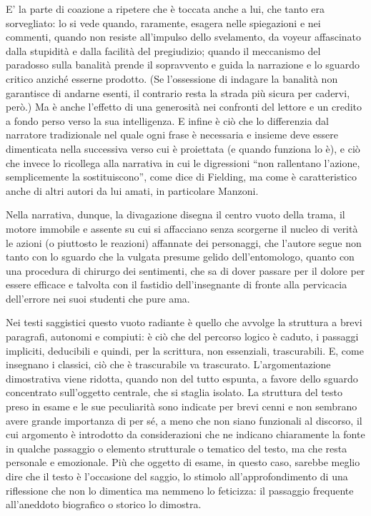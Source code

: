 E’ la parte di coazione a ripetere che è toccata anche a lui, che tanto era sorvegliato: lo si vede quando, raramente, esagera nelle spiegazioni e nei commenti, quando non resiste all’impulso dello svelamento, da voyeur affascinato dalla stupidità e dalla facilità del pregiudizio; quando il meccanismo del paradosso sulla banalità prende il sopravvento e guida la narrazione e lo sguardo critico anziché esserne prodotto. (Se l’ossessione di indagare la banalità non garantisce di andarne esenti, il contrario resta la strada più sicura per cadervi, però.) Ma è anche l’effetto di una generosità nei confronti del lettore e un credito a fondo perso verso la sua intelligenza. E infine è ciò che lo differenzia dal narratore tradizionale nel quale ogni frase è necessaria e insieme deve essere dimenticata nella successiva verso cui è proiettata (e quando funziona lo è), e ciò che invece lo ricollega alla narrativa in cui le digressioni “non rallentano l’azione, semplicemente la sostituiscono”, come dice di Fielding, ma come è caratteristico anche di altri autori da lui amati, in particolare Manzoni.\newline

Nella narrativa, dunque, la divagazione disegna il centro vuoto della trama, il motore immobile e assente su cui si affacciano senza scorgerne il nucleo di verità le azioni (o piuttosto le reazioni) affannate dei personaggi, che l’autore segue non tanto con lo sguardo che la vulgata presume gelido dell’entomologo, quanto con una procedura di chirurgo dei sentimenti, che sa di dover passare per il dolore per essere efficace e talvolta con il fastidio dell’insegnante di fronte alla pervicacia dell’errore nei suoi studenti che pure ama.\newline



Nei testi saggistici questo vuoto radiante è quello che avvolge la struttura a brevi paragrafi, autonomi e compiuti: è ciò che del percorso logico è caduto, i passaggi impliciti, deducibili e quindi, per la scrittura, non essenziali, trascurabili. E, come insegnano i classici, ciò che è trascurabile va trascurato. L’argomentazione dimostrativa viene ridotta, quando non del tutto espunta, a favore dello sguardo concentrato sull’oggetto centrale, che si staglia isolato. La struttura del testo preso in esame e le sue peculiarità sono indicate per brevi cenni e non sembrano avere grande importanza di per sé, a meno che non siano funzionali al discorso, il cui argomento è introdotto da considerazioni che ne indicano chiaramente la fonte in qualche passaggio o elemento strutturale o tematico del testo, ma che resta personale e emozionale. Più che oggetto di esame, in questo caso, sarebbe meglio dire che il testo è l’occasione del saggio, lo stimolo all’approfondimento di una riflessione che non lo dimentica ma nemmeno lo feticizza: il passaggio frequente all’aneddoto biografico o storico lo dimostra.

